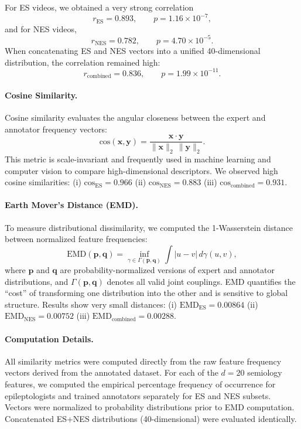\documentclass{article}
\theoremstyle{plain}
\theoremstyle{definition}
\theoremstyle{remark}
\begin{document}
For ES videos, we obtained a very strong correlation
\[
    r_{\text{ES}} = 0.893,\qquad p = 1.16 \times 10^{-7},
\]
and for NES videos,
\[
    r_{\text{NES}} = 0.782,\qquad p = 4.70 \times 10^{-5}.
\]
When concatenating ES and NES vectors into a unified 40-dimensional distribution, the correlation remained high:
\[
    r_{\text{combined}} = 0.836,\qquad p = 1.99 \times 10^{-11}.
\]

\vspace{0.3em}
\paragraph{Cosine Similarity.}
Cosine similarity evaluates the angular closeness between the expert and annotator frequency vectors:
\[
    \mathrm{cos}(\mathbf{x}, \mathbf{y}) = 
    \frac{\mathbf{x} \cdot \mathbf{y}}
         {\|\mathbf{x}\|_2 \, \|\mathbf{y}\|_2}.
\]
This metric is scale-invariant and frequently used in machine learning and computer vision to compare high-dimensional descriptors. We observed high cosine similarities: (i) $\mathrm{cos}_{\text{ES}} = 0.966$ (ii) $\mathrm{cos}_{\text{NES}} = 0.883$ (iii) $\mathrm{cos}_{\text{combined}} = 0.931$.
\vspace{0.3em}
\paragraph{Earth Mover's Distance (EMD).}
To measure distributional dissimilarity, we computed the 1-Wasserstein distance between normalized feature frequencies:
\[
    \mathrm{EMD}(\mathbf{p},\mathbf{q})
    = \inf_{\gamma \in \Gamma(\mathbf{p},\mathbf{q})}
      \int |u-v| \, d\gamma(u,v),
\]
where $\mathbf{p}$ and $\mathbf{q}$ are probability-normalized versions of expert and annotator distributions, and $\Gamma(\mathbf{p},\mathbf{q})$ denotes all valid joint couplings. EMD quantifies the “cost” of transforming one distribution into the other and is sensitive to global structure. Results show very small distances: (i) $\mathrm{EMD}_{\text{ES}} = 0.00864$ (ii) $\mathrm{EMD}_{\text{NES}} = 0.00752$ (iii) $\mathrm{EMD}_{\text{combined}} = 0.00288$.
\vspace{0.3em}
\paragraph{Computation Details.}
All similarity metrics were computed directly from the raw feature frequency vectors derived from the annotated dataset. For each of the $d=20$ semiology features, we computed the empirical percentage frequency of occurrence for epileptologists and trained annotators separately for ES and NES subsets. Vectors were normalized to probability distributions prior to EMD computation. Concatenated ES+NES distributions (40-dimensional) were evaluated identically.
\end{document}
